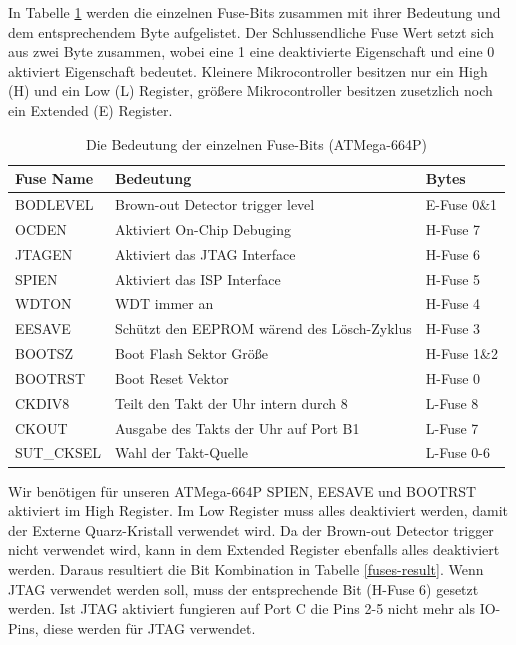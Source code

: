 In Tabelle \ref{fuses-names} werden die einzelnen Fuse-Bits zusammen mit ihrer
Bedeutung und dem entsprechendem Byte aufgelistet. Der Schlussendliche Fuse Wert
setzt sich aus zwei Byte zusammen, wobei eine 1 eine deaktivierte Eigenschaft und
eine 0 aktiviert Eigenschaft bedeutet. Kleinere Mikrocontroller besitzen nur ein
High (H) und ein Low (L) Register, größere Mikrocontroller besitzen zusetzlich
noch ein Extended (E) Register.

\begin{table} [H]
\begin{tabular}{|l|l|l|} \hline
Fuse Name & Bedeutung & Bytes\\ \hline
BODLEVEL & Brown-out Detector trigger level & E-Fuse 0\&1\\ \hline
OCDEN & Aktiviert On-Chip Debuging & H-Fuse 7\\ \hline
JTAGEN & Aktiviert das \ac{JTAG} Interface & H-Fuse 6\\ \hline
SPIEN & Aktiviert das \ac{ISP} Interface & H-Fuse 5\\ \hline
WDTON & \ac{WDT} immer an & H-Fuse 4\\ \hline
EESAVE & Schützt den \acs{EEPROM} wärend des Lösch-Zyklus & H-Fuse 3\\ \hline
BOOTSZ & Boot Flash Sektor Größe & H-Fuse 1\&2\\ \hline
BOOTRST & Boot Reset Vektor & H-Fuse 0\\ \hline
CKDIV8 & Teilt den Takt der Uhr intern durch 8 & L-Fuse 8\\ \hline
CKOUT & Ausgabe des Takts der Uhr auf Port B1 & L-Fuse 7\\ \hline
SUT\_CKSEL & Wahl der Takt-Quelle & L-Fuse 0-6\\ \hline
\end{tabular}
\caption{Die Bedeutung der einzelnen Fuse-Bits (ATMega-664P)}
\label{fuses-names}
\end{table}

Wir benötigen für unseren ATMega-664P SPIEN, EESAVE und BOOTRST aktiviert im
High Register. Im Low Register muss alles deaktiviert werden, damit der Externe
Quarz-Kristall verwendet wird. Da der Brown-out Detector trigger nicht
verwendet wird, kann in dem Extended Register ebenfalls alles deaktiviert
werden. Daraus resultiert die Bit Kombination in Tabelle \ref{fuses-result}.
Wenn \ac{JTAG} verwendet werden soll, muss der entsprechende Bit (H-Fuse 6)
gesetzt werden. Ist \ac{JTAG} aktiviert fungieren auf Port C die Pins 2-5
nicht mehr als IO-Pins, diese werden für \ac{JTAG} verwendet.

